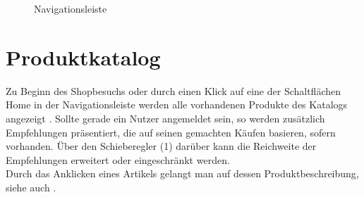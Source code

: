\begin{figure}[h!]
  \centering
  \caption{Navigationsleiste}
  \label{fig:Navigationsleiste}
\end{figure}


\section{Produktkatalog}
Zu Beginn des Shopbesuchs oder durch einen Klick auf eine der Schaltflächen Home in der Navigationsleiste werden alle vorhandenen Produkte des Katalogs angezeigt . Sollte gerade ein Nutzer angemeldet sein, so werden zusätzlich Empfehlungen prä\-sen\-tiert, die auf seinen gemachten Käufen basieren, sofern vorhanden. Über den Schieberegler (1) darüber kann die Reichweite der Empfehlungen erweitert oder eingeschränkt werden. \\
Durch das Anklicken eines Artikels gelangt man auf dessen Produktbeschreibung, siehe auch .

